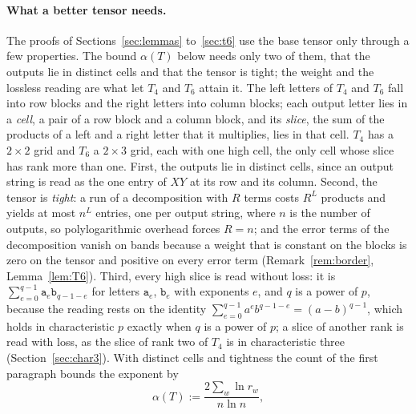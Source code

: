 \documentclass[11pt]{article}
\theoremstyle{definition}
\theoremstyle{remark}
\begin{document}
\paragraph{What a better tensor needs.} The proofs of Sections~\ref{sec:lemmas} to~\ref{sec:t6} use the base tensor only through a few properties. The bound $\alpha(T)$ below needs only two of them, that the outputs lie in distinct cells and that the tensor is tight; the weight and the lossless reading are what let $T_4$ and $T_6$ attain it. The left letters of $T_4$ and $T_6$ fall into row blocks and the right letters into column blocks; each output letter lies in a \emph{cell}, a pair of a row block and a column block, and its \emph{slice}, the sum of the products of a left and a right letter that it multiplies, lies in that cell. $T_4$ has a $2\times2$ grid and $T_6$ a $2\times3$ grid, each with one high cell, the only cell whose slice has rank more than one. First, the outputs lie in distinct cells, since an output string is read as the one entry of $XY$ at its row and its column. Second, the tensor is \emph{tight}: a run of a decomposition with $R$ terms costs $R^L$ products and yields at most $n^L$ entries, one per output string, where $n$ is the number of outputs, so polylogarithmic overhead forces $R=n$; and the error terms of the decomposition vanish on bands because a weight that is constant on the blocks is zero on the tensor and positive on every error term (Remark~\ref{rem:border}, Lemma~\ref{lem:T6}). Third, every high slice is read without loss: it is $\sum_{e=0}^{q-1}\mathtt a_e\mathtt b_{q-1-e}$ for letters $\mathtt a_e$, $\mathtt b_e$ with exponents $e$, and $q$ is a power of $p$, because the reading rests on the identity $\sum_{e=0}^{q-1}a^eb^{q-1-e}=(a-b)^{q-1}$, which holds in characteristic $p$ exactly when $q$ is a power of $p$; a slice of another rank is read with loss, as the slice of rank two of $T_4$ is in characteristic three (Section~\ref{sec:char3}). With distinct cells and tightness the count of the first paragraph bounds the exponent by
\[
\alpha(T):=\frac{2\sum_w\ln r_w}{n\ln n},
\]
\end{document}

